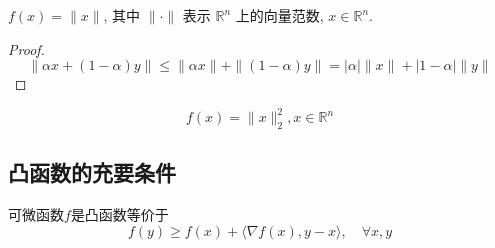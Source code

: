 \begin{example}
    \label{Example:NormIsConvex}
    $ f(x)=\|x\| $, 其中 $ \|  \cdot \| $ 表示 $ \mathbb{R}^{n} $ 上的向量范数, $ x \in \mathbb{R}^{n} $.
\end{example}

\begin{proof}
    \label{Example:L2NormIsConvex}
    $$ \|\alpha x+(1-\alpha) y\| \leq\|\alpha x\|+\|(1-\alpha) y\|=|\alpha|\|x\|+|1-\alpha|\|y\| $$
\end{proof}

\begin{example}
    $$ f(x)=\|x\|_{2}^{2}, x \in \mathbb{R}^{n} $$
\end{example}

\subsection{凸函数的充要条件}

\begin{theorem}
    \label{Theorem:ConvexDiffential}

    可微函数$f$是凸函数等价于
    $$ f(y) \geq f(x)+\langle\nabla f(x), y-x\rangle, \quad \forall x, y $$
\end{theorem}

